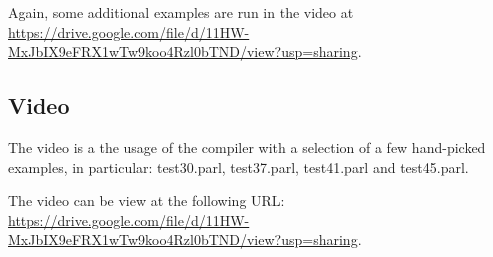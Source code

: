 Again, some additional examples are run in the video at
\url{https://drive.google.com/file/d/11HW-MxJbIX9eFRX1wTw9koo4Rzl0bTND/view?usp=sharing}.

\subsection{Video}

The video is a the usage of the compiler with a selection of a
few hand-picked examples, in particular: test30.parl,
test37.parl, test41.parl and test45.parl.

The video can be view at the following URL:
\url{https://drive.google.com/file/d/11HW-MxJbIX9eFRX1wTw9koo4Rzl0bTND/view?usp=sharing}.
